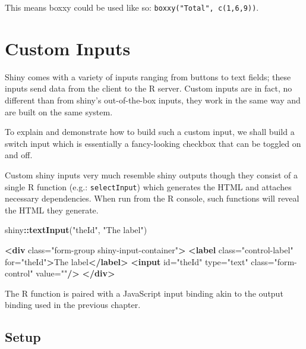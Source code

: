 \documentclass[
  10pt,
]{krantz}
\makeatletter
\newenvironment{Shaded}{\begin{snugshade}}{\end{snugshade}}
\newcommand{\KeywordTok}[1]{\textcolor[rgb]{0.27,0.27,0.27}{\textbf{#1}}}
\newcommand{\NormalTok}[1]{#1}
\newcommand{\OperatorTok}[1]{\textcolor[rgb]{0.43,0.43,0.43}{\textbf{#1}}}
\newcommand{\OtherTok}[1]{\textcolor[rgb]{0.37,0.37,0.37}{#1}}
\newcommand{\StringTok}[1]{\textcolor[rgb]{0.5,0.5,0.5}{#1}}
\newenvironment{kframe}{%
\medskip{}
\setlength{\fboxsep}{.8em}
 \def\at@end@of@kframe{}%
 \ifinner\ifhmode%
  \def\at@end@of@kframe{\end{minipage}}%
  \begin{minipage}{\columnwidth}%
 \fi\fi%
 \def\FrameCommand##1{\hskip\@totalleftmargin \hskip-\fboxsep
 \colorbox{shadecolor}{##1}\hskip-\fboxsep
     \hskip-\linewidth \hskip-\@totalleftmargin \hskip\columnwidth}%
 \MakeFramed {\advance\hsize-\width
   \@totalleftmargin\z@ \linewidth\hsize
   \@setminipage}}%
 {\par\unskip\endMakeFramed%
 \at@end@of@kframe}
\renewenvironment{Shaded}{\begin{kframe}}{\end{kframe}}
\makeatother
\begin{document}
This means boxxy could be used like so: \texttt{boxxy("Total",\ c(1,6,9))}.

\hypertarget{shiny-input}{%
\chapter{Custom Inputs}\label{shiny-input}}

Shiny comes with a variety of inputs ranging from buttons to text fields; these inputs send data from the client to the R server. Custom inputs are in fact, no different than from shiny's out-of-the-box inputs, they work in the same way and are built on the same system.

To explain and demonstrate how to build such a custom input, we shall build a switch input which is essentially a fancy-looking checkbox that can be toggled on and off.

Custom shiny inputs very much resemble shiny outputs though they consist of a single R function (e.g.: \texttt{selectInput}) which generates the HTML and attaches necessary dependencies. When run from the R console, such functions will reveal the HTML they generate.

\begin{Shaded}
\begin{Highlighting}[]
\NormalTok{shiny}\OperatorTok{::}\KeywordTok{textInput}\NormalTok{(}\StringTok{"theId"}\NormalTok{, }\StringTok{"The label"}\NormalTok{)   }
\end{Highlighting}
\end{Shaded}

\begin{Shaded}
\begin{Highlighting}[]
\KeywordTok{<div}\OtherTok{ class=}\StringTok{"form{-}group shiny{-}input{-}container"}\KeywordTok{>}
  \KeywordTok{<label}\OtherTok{ class=}\StringTok{"control{-}label"}\OtherTok{ for=}\StringTok{"theId"}\KeywordTok{>}\NormalTok{The label}\KeywordTok{</label>}
  \KeywordTok{<input}\OtherTok{ id=}\StringTok{"theId"}\OtherTok{ type=}\StringTok{"text"}\OtherTok{ class=}\StringTok{"form{-}control"}\OtherTok{ value=}\StringTok{""}\KeywordTok{/>}
\KeywordTok{</div>}
\end{Highlighting}
\end{Shaded}

The R function is paired with a JavaScript input binding akin to the output binding used in the previous chapter.

\hypertarget{shiny-input-setup}{%
\section{Setup}\label{shiny-input-setup}}
\end{document}
